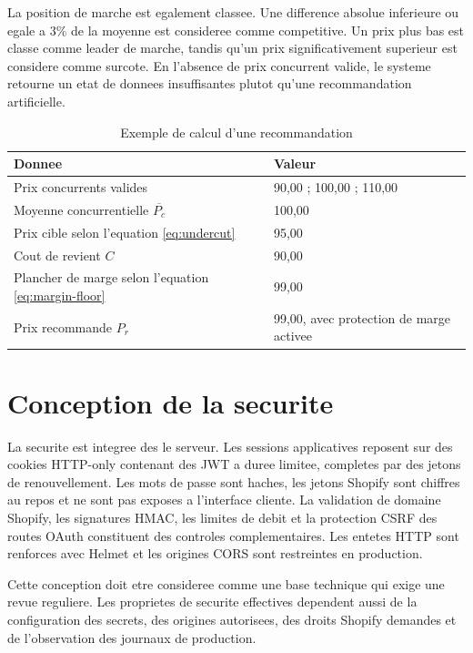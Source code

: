 \documentclass[12pt,a4paper,oneside]{report}
\begin{document}
La position de marche est egalement classee. Une difference absolue inferieure ou egale a 3\% de la moyenne est consideree comme competitive. Un prix plus bas est classe comme leader de marche, tandis qu'un prix significativement superieur est considere comme surcote. En l'absence de prix concurrent valide, le systeme retourne un etat de donnees insuffisantes plutot qu'une recommandation artificielle.

\begin{table}[H]
\centering
\caption{Exemple de calcul d'une recommandation}
\label{tab:pricing-example}
\begin{tabularx}{\textwidth}{p{}Y}
\toprule
\textbf{Donnee} & \textbf{Valeur} \\
\midrule
Prix concurrents valides & 90,00 ; 100,00 ; 110,00 \\
Moyenne concurrentielle $\overline{P_c}$ & 100,00 \\
Prix cible selon l'equation \ref{eq:undercut} & 95,00 \\
Cout de revient $C$ & 90,00 \\
Plancher de marge selon l'equation \ref{eq:margin-floor} & 99,00 \\
Prix recommande $P_r$ & 99,00, avec protection de marge activee \\
\bottomrule
\end{tabularx}
\end{table}

\section{Conception de la securite}
La securite est integree des le serveur. Les sessions applicatives reposent sur des cookies HTTP-only contenant des JWT a duree limitee, completes par des jetons de renouvellement. Les mots de passe sont haches, les jetons Shopify sont chiffres au repos et ne sont pas exposes a l'interface cliente. La validation de domaine Shopify, les signatures HMAC, les limites de debit et la protection CSRF des routes OAuth constituent des controles complementaires. Les entetes HTTP sont renforces avec Helmet et les origines CORS sont restreintes en production.

Cette conception doit etre consideree comme une base technique qui exige une revue reguliere. Les proprietes de securite effectives dependent aussi de la configuration des secrets, des origines autorisees, des droits Shopify demandes et de l'observation des journaux de production.
\end{document}
